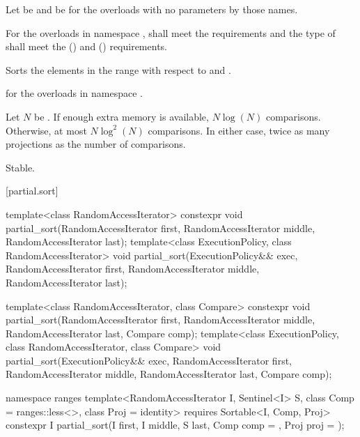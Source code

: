 \begin{itemdescr}
\pnum
Let  be 
and  be 
for the overloads with no parameters by those names.

\pnum
\requires
For the overloads in namespace ,
 shall meet
the  requirements and
the type of  shall meet
the  () and
 () requirements.

\pnum
\effects
Sorts the elements in the range 
with respect to  and .

\pnum
\returns
{} for the overloads in namespace .

\pnum
\complexity
Let $N$ be .
If enough extra memory is available, $N \log(N)$ comparisons.
Otherwise, at most $N \log^2(N)$ comparisons.
In either case, twice as many projections as the number of comparisons.

\pnum
\remarks
Stable.
\end{itemdescr}

[partial.sort]{}

%
\begin{itemdecl}
template<class RandomAccessIterator>
  constexpr void partial_sort(RandomAccessIterator first,
                              RandomAccessIterator middle,
                              RandomAccessIterator last);
template<class ExecutionPolicy, class RandomAccessIterator>
  void partial_sort(ExecutionPolicy&& exec,
                    RandomAccessIterator first,
                    RandomAccessIterator middle,
                    RandomAccessIterator last);

template<class RandomAccessIterator, class Compare>
  constexpr void partial_sort(RandomAccessIterator first,
                              RandomAccessIterator middle,
                              RandomAccessIterator last,
                              Compare comp);
template<class ExecutionPolicy, class RandomAccessIterator, class Compare>
  void partial_sort(ExecutionPolicy&& exec,
                    RandomAccessIterator first,
                    RandomAccessIterator middle,
                    RandomAccessIterator last,
                    Compare comp);

namespace ranges {
  template<RandomAccessIterator I, Sentinel<I> S, class Comp = ranges::less<>,
           class Proj = identity>
    requires Sortable<I, Comp, Proj>
    constexpr I
      partial_sort(I first, I middle, S last, Comp comp = {}, Proj proj = {});
}
\end{itemdecl}

